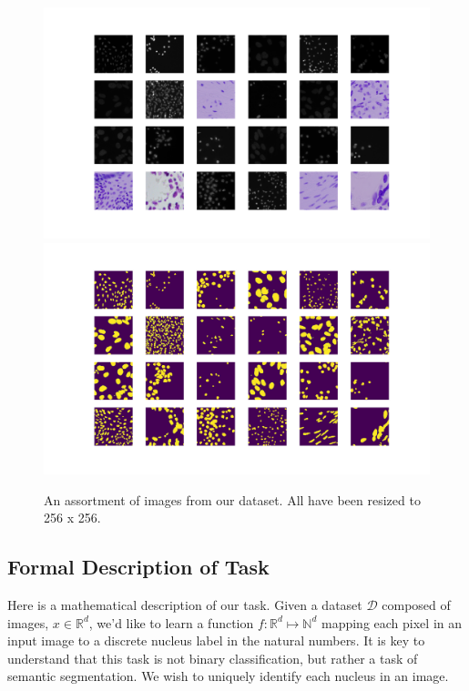 \documentclass[paper=letter, fontsize=12pt]{article}
\numberwithin{equation}{section} %
\numberwithin{figure}{section} %
\numberwithin{table}{section} %
\begin{document}
\begin{figure}
    \centering
    \includegraphics[width=\textwidth]{./figs/dsbowl18-imagegrid-4x6.png}
    \includegraphics[width=\textwidth]{./figs/dsbowl18-imagegrid-masks-4x6.png}
    \caption{An assortment of images from our dataset.  All have been resized
    to 256 x 256.}
    \label{fig:dsbowl18-grid}
\end{figure}

\subsection{Formal Description of Task}

Here is a mathematical description of our task.  Given a dataset $\mathcal{D}$
composed of images, $x \in \mathbb{R}^{d}$, we'd like to learn a function $f :
\mathbb{R}^{d} \mapsto \mathbb{N}^{d}$ mapping each pixel in an input image to
a discrete nucleus label in the natural numbers.  It is key to understand that
this task is not binary classification, but rather a task of semantic
segmentation.  We wish to uniquely identify each nucleus in an image.
\end{document}
